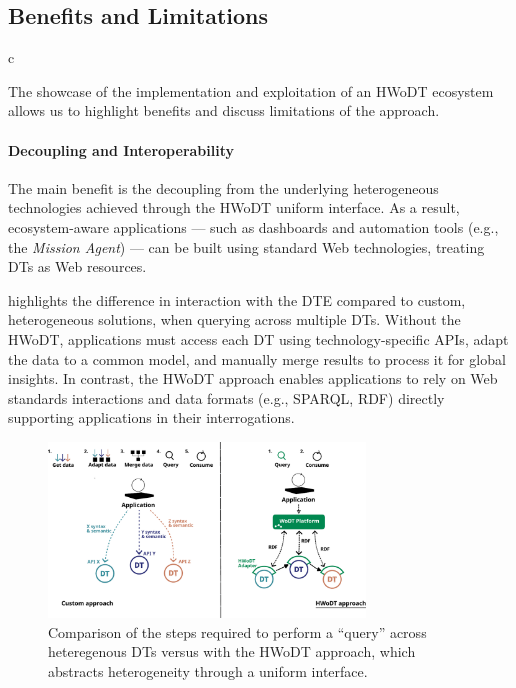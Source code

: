 

\subsection{Benefits and Limitations}
\label{ssec:benefits-limitations}

c

The showcase of the implementation and exploitation of an \ac{HWoDT} ecosystem allows us to highlight benefits and discuss limitations of the approach.

\paragraph{Decoupling and Interoperability}
The main benefit is the decoupling from the underlying heterogeneous technologies achieved through the \ac{HWoDT} uniform interface.
%
As a result, ecosystem-aware applications — such as dashboards and automation tools (e.g., the \emph{Mission Agent}) — can be built using standard Web technologies, treating \acp{DT} as Web resources.

 highlights the difference in interaction with the \ac{DTE} compared to custom, heterogeneous solutions, when querying across multiple \acp{DT}.
%
Without the \ac{HWoDT}, applications must access each \ac{DT} using technology-specific \acp{API}, adapt the data to a common model, and manually merge results to process it for global insights.
In contrast, the \ac{HWoDT} approach enables applications to rely on Web standards interactions and data formats (e.g., SPARQL, \ac{RDF}) directly supporting applications in their interrogations.

\begin{figure}[ht]
  \centering
  \includegraphics[width=0.75\textwidth]{figures/hwodt/comparison_custom_hwodt.pdf}
  \caption{Comparison of the steps required to perform a ``query'' across heteregenous \acp{DT} versus with the \ac{HWoDT} approach, which abstracts heterogeneity through a uniform interface.}
  \label{fig:comparison-custom-vs-hwodt}
\end{figure}

